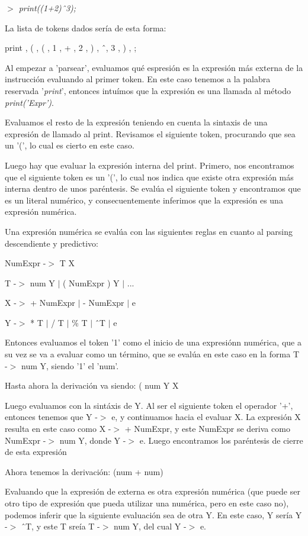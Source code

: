 \documentclass[12pt]{article}
\newcommand{\ini}{$>$ }
\begin{document}
	\emph{\ini print((1+2)\^\ 3);}
	
	La lista de tokens dados sería de esta forma:
	
	print , ( , ( , 1 , + , 2 , ) , \^\ , 3 , ) , ;
	
	Al empezar a 'parsear', evaluamos qué espresión es la expresión más externa de la instrucción evaluando al primer token.
	En este caso tenemos a la palabra reservada '\emph{print}', entonces intuímos que la expresión es una llamada al método \emph{print('Expr')}.
	
	Evaluamos el resto de la expresión teniendo en cuenta la sintaxis de una expresión de llamado al print.
	Revisamos el siguiente token, procurando que sea un '(', lo cual es cierto en este caso.
	
	Luego hay que evaluar la expresión interna del print.
	Primero, nos encontramos que el siguiente token es un '(', lo cual nos indica que existe otra expresión más interna dentro de unos paréntesis.
	Se evalúa el siguiente token y encontramos que es un literal numérico, y consecuentemente inferimos que la expresión es una expresión numérica.
	
	Una expresión numérica se evalúa con las siguientes reglas en cuanto al parsing descendiente y predictivo:
	
	NumExpr -$>$ T X
	
	T -$>$ num Y $|$ ( NumExpr ) Y $|$ ...
	
	X -$>$ + NumExpr $|$ - NumExpr $|$ e
	
	Y -$>$ * T $|$ / T $|$ \% T $|$ \^\ T $|$ e
	
	Entonces evaluamos el token '1' como el inicio de una expresiónn numérica, que a su vez se va a evaluar como un término, que se evalúa en este caso en la forma T -$>$ num Y, siendo '1' el 'num'.
	
	Hasta ahora la derivación va siendo: ( num Y X
	
	Luego evaluamos con la sintáxis de Y.
	Al ser el siguiente token el operador '+', entonces tenemos que Y -$>$ e, y continuamos hacia el evaluar X.
	La expresión X resulta en este caso como X -$>$ + NumExpr, y este NumExpr se deriva como NumExpr -$>$ num Y, donde Y -$>$ e.
	Luego encontramos los paréntesis de cierre de esta expresión
	
	Ahora tenemos la derivación: (num + num)
	
	Evaluando que la expresión de externa es otra expresión numérica (que puede ser otro tipo de expresión que pueda utilizar una numérica, pero en este caso no), podemos inferir que la siguiente evaluación sea de otra Y.
	En este caso, Y sería Y -$>$ \^\ T, y este T sreía T -$>$ num Y, del cual Y -$>$ e.
	
\end{document}
